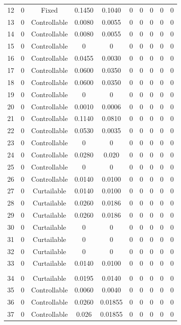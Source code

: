 \begin{longtable}{cccccccccc}
	12 & 0 & Fixed & 0.1450 & 0.1040 & 0 & 0 & 0 & 0 & 0 \\
	13 & 0 & Controllable & 0.0080 & 0.0055 & 0 & 0 & 0 & 0 & 0 \\
	14 & 0 & Controllable & 0.0080 & 0.0055 & 0 & 0 & 0 & 0 & 0 \\
	15 & 0 & Controllable & 0 & 0 & 0 & 0 & 0 & 0 & 0 \\
	16 & 0 & Controllable & 0.0455 & 0.0030 & 0 & 0 & 0 & 0 & 0 \\
	17 & 0 & Controllable & 0.0600 & 0.0350 & 0 & 0 & 0 & 0 & 0 \\
	18 & 0 & Controllable & 0.0600 & 0.0350 & 0 & 0 & 0 & 0 & 0 \\
	19 & 0 & Controllable & 0 & 0 & 0 & 0 & 0 & 0 & 0 \\
	20 & 0 & Controllable & 0.0010 & 0.0006 & 0 & 0 & 0 & 0 & 0 \\
	21 & 0 & Controllable & 0.1140 & 0.0810 & 0 & 0 & 0 & 0 & 0 \\
	22 & 0 & Controllable & 0.0530 & 0.0035 & 0 & 0 & 0 & 0 & 0 \\
	23 & 0 & Controllable & 0 & 0 & 0 & 0 & 0 & 0 & 0 \\
	24 & 0 & Controllable & 0.0280 & 0.020 & 0 & 0 & 0 & 0 & 0 \\
	25 & 0 & Controllable & 0 & 0 & 0 & 0 & 0 & 0 & 0 \\
	26 & 0 & Controllable & 0.0140 & 0.0100 & 0 & 0 & 0 & 0 & 0 \\
	27 & 0 & Curtailable & 0.0140 & 0.0100 & 0 & 0 & 0 & 0 & 0 \\
	28 & 0 & Curtailable & 0.0260 & 0.0186 & 0 & 0 & 0 & 0 & 0 \\
	29 & 0 & Curtailable & 0.0260 & 0.0186 & 0 & 0 & 0 & 0 & 0 \\
	30 & 0 & Curtailable & 0 & 0 & 0 & 0 & 0 & 0 & 0 \\
	31 & 0 & Curtailable & 0 & 0 & 0 & 0 & 0 & 0 & 0 \\
	32 & 0 & Curtailable & 0 & 0 & 0 & 0 & 0 & 0 & 0 \\
	33 & 0 & Curtailable & 0.0140 & 0.0100 & 0 & 0 & 0 & 0 & 0 \\
	\bottomrule  \\ 
	\toprule 
	34 & 0 & Curtailable & 0.0195 & 0.0140 & 0 & 0 & 0 & 0 & 0 \\
	35 & 0 & Controllable & 0.0060 & 0.0040 & 0 & 0 & 0 & 0 & 0 \\
	36 & 0 & Controllable & 0.0260 & 0.01855 & 0 & 0 & 0 & 0 & 0 \\
	37 & 0 & Controllable & 0.026 & 0.01855 & 0 & 0 & 0 & 0 & 0 \\

\end{longtable}

